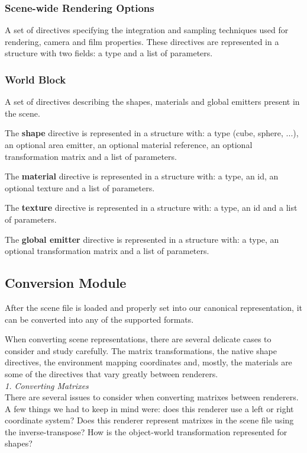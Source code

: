 \subsubsection{Scene-wide Rendering Options}
A set of directives specifying the integration and sampling techniques used for 
rendering, camera and film properties. These directives are represented in a 
structure with two fields: a type and a list of parameters.

\subsubsection{World Block}
A set of directives describing the shapes, materials and global emitters present 
in the scene. 

The \textbf{shape} directive is represented in a structure with: a type (cube, 
sphere, ...), an optional area emitter, an optional material reference, an 
optional transformation matrix and a list of parameters. 

The \textbf{material} directive is represented in a structure with: a type, an 
id, an optional texture and a list of parameters.

The \textbf{texture} directive is represented in a structure with: a type, an id 
and a list of parameters.

The \textbf{global emitter} directive is represented in a structure with: a 
type, an optional transformation matrix and a list of parameters.

\subsection{Conversion Module}
After the scene file is loaded and properly set into our canonical 
representation, it can be converted into any of the supported formats.

When converting scene representations, there are several delicate cases to 
consider and study carefully. The matrix transformations, the native shape 
directives, the environment mapping coordinates and, mostly, the materials are 
some of the directives that vary greatly between renderers. \\

\textit{1. Converting Matrixes} \\
There are several issues to consider when converting matrixes between renderers. 
A few things we had to keep in mind were: does this renderer use a left or right 
coordinate system? Does this renderer represent matrixes in the scene file using 
the inverse-transpose? How is the object-world transformation represented for 
shapes?

